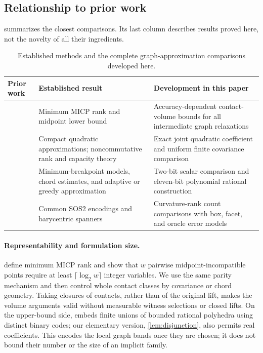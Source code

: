 \subsection{Relationship to prior work}

 summarizes the closest comparisons. Its last
column describes results proved here, not the novelty of all their
ingredients.
\begin{table}[htbp]
\centering\small
\begin{tabular}{@{}>{\raggedright\arraybackslash}p{}>{\raggedright\arraybackslash}p{}>{\raggedright\arraybackslash}p{}@{}}
\toprule
Prior work & Established result & Development in this paper\\
\midrule
\citet{lubin2022} & Minimum MICP rank and midpoint lower bound & Accuracy-dependent contact-volume bounds for all intermediate graph relaxations\\
\citet{beach2022,ggow2020,iqs2018} & Compact quadratic approximations; noncommutative rank and capacity theory & Exact joint quadratic coefficient and uniform finite covariance comparison\\
\citet{rebennack2015,simchowitz2018,codsi2025} & Minimum-breakpoint models, chord estimates, and adaptive or greedy approximation & Two-bit scalar comparison and eleven-bit polynomial rational construction\\
\citet{lyu2026,awerbuch2004} & Common SOS2 encodings and barycentric spanners & Curvature-rank count comparisons with box, facet, and oracle error models\\
\bottomrule
\end{tabular}
\caption{Established methods and the complete graph-approximation comparisons developed here.}
\label{tab:result-map}
\end{table}

\paragraph{Representability and formulation size.}
\citet[Definition 4.3 and Lemma 4.1]{lubin2022} define minimum MICP rank
and show that $w$ pairwise midpoint-incompatible points require at least
$\lceil\log_2w\rceil$ integer variables. We use the same parity
mechanism and then control whole contact classes by covariance or chord
geometry. Taking closures of contacts, rather than of the original lift,
makes the volume arguments valid without measurable witness selections
or closed lifts. On the upper-bound side, \citet[Proposition 1]{vielma2018}
embeds finite unions of bounded rational polyhedra using distinct binary
codes; our elementary version, \cref{lem:disjunction}, also permits real
coefficients. This encodes the local graph bands once they are chosen;
it does not bound their number or the size of an implicit family.

